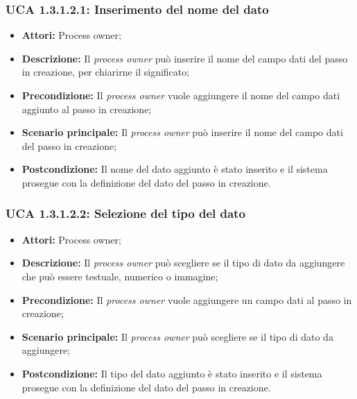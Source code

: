 \hypertarget{A1.3.1.2.1}{}
\subsubsection{UCA 1.3.1.2.1: Inserimento del nome del dato}
\begin{itemize}
\item \textbf{Attori:} Process owner;
\item \textbf{Descrizione:}
Il \textit{process owner} può inserire il nome del campo dati del passo in creazione, per chiarirne il significato;
\item \textbf{Precondizione:}
Il \textit{process owner} vuole aggiungere il nome del campo dati aggiunto al passo in creazione;
\item \textbf{Scenario principale:}
Il \textit{process owner} può inserire il nome del campo dati del passo in creazione;
\item \textbf{Postcondizione:}
Il nome del dato aggiunto è stato inserito e il sistema prosegue con la definizione del dato del passo in creazione.
\end{itemize}

\hypertarget{A1.3.1.2.2}{}
\subsubsection{UCA 1.3.1.2.2: Selezione del tipo del dato}
\begin{itemize}
\item \textbf{Attori:} Process owner;
\item \textbf{Descrizione:}
Il \textit{process owner} può scegliere se il tipo di dato da aggiungere che può essere testuale, numerico o immagine;
\item \textbf{Precondizione:}
Il \textit{process owner} vuole aggiungere un campo dati al passo in creazione;
\item \textbf{Scenario principale:}
Il \textit{process owner} può scegliere se il tipo di dato da aggiungere;
\item \textbf{Postcondizione:}
Il tipo del dato aggiunto è stato inserito e il sistema prosegue con la definizione del dato del passo in creazione.
\end{itemize}

\hypertarget{A1.3.1.3}{}
